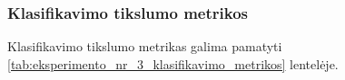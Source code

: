 \subsubsection{Klasifikavimo tikslumo metrikos}
\label{subsubsec:eksperimentas_nr_3_klasifikacijos_tikslumo_metrikos}

Klasifikavimo tikslumo metrikas galima pamatyti \ref{tab:eksperimento_nr_3_klasifikavimo_metrikos} lentelėje.

